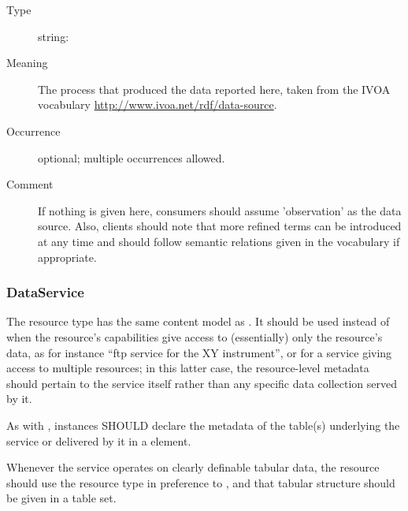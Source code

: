 \documentclass[11pt,a4paper]{ivoa}
\begin{document}
\begin{generated}
\begin{bigdescription}
\begin{description}
\end{description}
\item[Element \xmlel{dataSource}]
\begin{description}
\item[Type] string: 
\item[Meaning] The process that produced the data reported here,
	              		taken from the IVOA vocabulary
	              		\url{http://www.ivoa.net/rdf/data-source}.
\item[Occurrence] optional; multiple occurrences allowed.
\item[Comment] If nothing is given here, consumers should assume
	              	   'observation' as the data source.  Also, clients
	              	   should note that more refined terms can be introduced
	              	   at any time and should follow semantic relations
	              	   given in the vocabulary if appropriate.

\end{description}


\end{bigdescription}\endgroup

\endgroup
\end{generated}


\subsubsection{DataService}

The  resource type has the same content model as
.  It should be used instead of
 when the resource's capabilities give
access to (essentially) only the resource's data, as for instance
``ftp service for the XY instrument'', or for a service giving access
to multiple resources; in this latter case, the resource-level
metadata should pertain to the service itself rather than any specific
data collection served by it.

As with , instances SHOULD
declare the metadata of the table(s) underlying the service or
delivered by it in a  element.

Whenever the service operates on clearly definable tabular
data, the resource should use the  resource type
in preference to , and that tabular structure
should be given in a table set.
\end{document}
